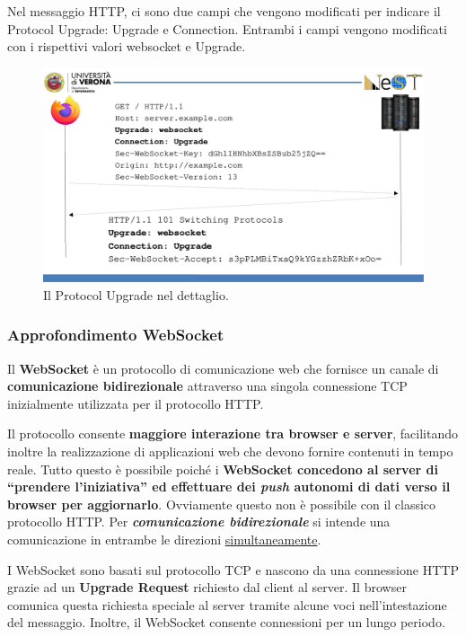 \documentclass[a4paper]{article}
\newcommand{\dquotes}[1]{``#1''}
\begin{document}
	\noindent
	Nel messaggio HTTP, ci sono due campi che vengono modificati per indicare il Protocol Upgrade: \textsf{Upgrade} e \textsf{Connection}. Entrambi i campi vengono modificati con i rispettivi valori \textsf{websocket} e \textsf{Upgrade}.\newpage
	
	\noindent
	\begin{figure}[!htp]
		\centering
		\includegraphics[width=\textwidth]{img/protocol_upgrade.pdf}
		\caption{Il Protocol Upgrade nel dettaglio.}
	\end{figure}\newpage

	\subsubsection{Approfondimento WebSocket}
	
	Il \textbf{WebSocket} è un protocollo di comunicazione web che fornisce un canale di \textbf{comunicazione bidirezionale} attraverso una singola connessione TCP inizialmente utilizzata per il protocollo HTTP.
	
	Il protocollo consente \textbf{maggiore interazione tra browser e server}, facilitando inoltre la realizzazione di applicazioni web che devono fornire contenuti in tempo reale. Tutto questo è possibile poiché i \textbf{WebSocket concedono al server di \dquotes{prendere l'iniziativa} ed effettuare dei \emph{push} autonomi di dati verso il browser per aggiornarlo}. Ovviamente questo non è possibile con il classico protocollo HTTP. Per \textbf{\emph{comunicazione bidirezionale}} si intende una comunicazione in entrambe le direzioni \underline{simultaneamente}.\newline
	
	\noindent
	I WebSocket sono basati sul protocollo TCP e nascono da una connessione HTTP grazie ad un \textbf{Upgrade Request} richiesto dal client al server. Il browser comunica questa richiesta speciale al server tramite alcune voci nell'intestazione del messaggio. Inoltre, il WebSocket consente connessioni per un lungo periodo.\newline
	
\end{document}
